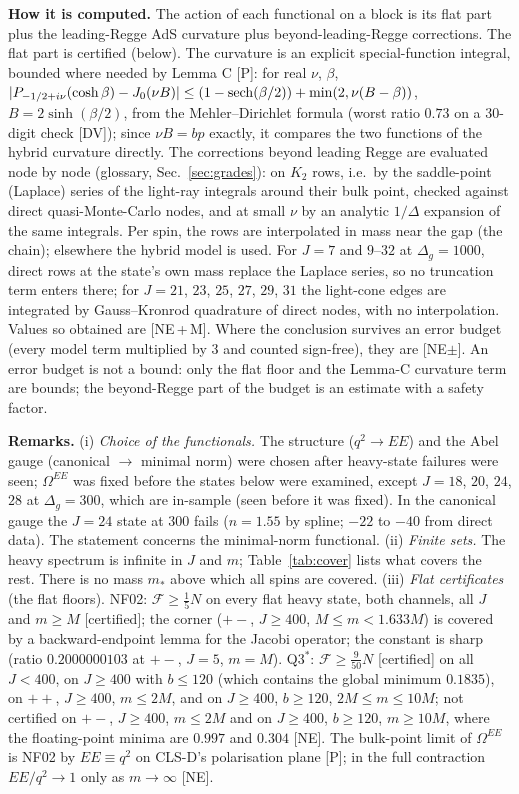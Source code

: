 \documentclass[aps,prl,onecolumn,superscriptaddress,nofootinbib]{revtex4-2}
\begin{document}
\textbf{How it is computed.} The action of each functional on a block is its flat part plus the leading-Regge
AdS curvature plus beyond-leading-Regge corrections. The flat part is certified (below). The curvature is an
explicit special-function integral, bounded where needed by Lemma C [P]: for real $\nu$, $\beta$,
$|P_{-1/2+i\nu}(\cosh\beta)-J_0(\nu B)|\le(1-{\rm sech}(\beta/2))+\min(2,\nu(B-\beta))$, $B=2\sinh(\beta/2)$, from the
Mehler--Dirichlet formula (worst ratio $0.73$ on a 30-digit check [DV]); since $\nu B=bp$ exactly, it compares the
two functions of the hybrid curvature directly. The corrections beyond leading Regge are evaluated node by node (glossary,
Sec.~\ref{sec:grades}): on $K_2$ rows, i.e.\ by the saddle-point (Laplace) series of the light-ray integrals around their bulk point, checked against
direct quasi-Monte-Carlo nodes, and at small $\nu$ by an analytic $1/\Delta$ expansion of the same integrals. Per spin, the rows are
interpolated in mass near the gap (the chain); elsewhere the hybrid model is used. For $J=7$ and $9$--$32$ at $\Delta_g=1000$, direct rows
at the state's own mass replace the Laplace series, so no truncation term enters there; for $J=21$, $23$, $25$, $27$, $29$, $31$ the
light-cone edges are integrated by Gauss--Kronrod quadrature of direct nodes, with no interpolation. Values so obtained are [NE\,+\,M].
Where the conclusion survives an error budget (every model term multiplied by $3$ and counted sign-free), they are [NE$\pm$]. An
error budget is not a bound: only the flat floor and the Lemma-C curvature term are bounds; the beyond-Regge
part of the budget is an estimate with a safety factor.

\textbf{Remarks.} (i) \emph{Choice of the functionals.} The structure ($q^2\to EE$) and the Abel gauge
(canonical $\to$ minimal norm) were chosen after heavy-state failures were seen; $\Omega^{EE}$ was
fixed before the states below were examined, except $J=18$, $20$, $24$, $28$ at $\Delta_g=300$, which are
in-sample (seen before it was fixed). In the canonical gauge the $J=24$ state at $300$ fails ($n=1.55$ by spline; $-22$ to $-40$
from direct data). The statement concerns the minimal-norm functional. (ii) \emph{Finite sets.} The
heavy spectrum is infinite in $J$ and $m$; Table~\ref{tab:cover} lists what covers the rest. There is no mass
$m_*$ above which all spins are covered. (iii) \emph{Flat certificates} (the flat floors). NF02: $\mathcal F\ge\tfrac15N$ on
every flat heavy state, both channels, all $J$ and $m\ge M$ [certified]; the corner ($+-$,
$J\ge400$, $M\le m<1.633M$) is covered by a backward-endpoint lemma for the Jacobi operator; the constant is sharp
(ratio $0.2000000103$ at $+-$, $J=5$, $m=M$). Q3$^*$: $\mathcal F\ge\tfrac{9}{50}N$ [certified] on all $J<400$, on $J\ge400$
with $b\le120$ (which contains the global minimum $0.1835$), on $++$, $J\ge400$, $m\le2M$, and on $J\ge400$, $b\ge120$,
$2M\le m\le10M$; not certified on $+-$, $J\ge400$, $m\le2M$ and on $J\ge400$, $b\ge120$, $m\ge10M$, where the
floating-point minima are $0.997$ and $0.304$ [NE]. The bulk-point limit of $\Omega^{EE}$ is NF02 by $EE\equiv q^2$ on
CLS-D's polarisation plane [P]; in the full contraction $EE/q^2\to1$ only as $m\to\infty$ [NE].
\end{document}
